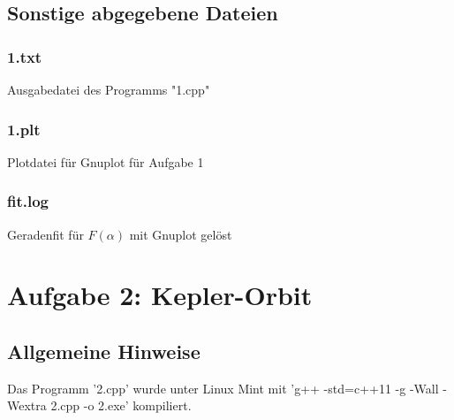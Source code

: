 \documentclass{scrreprt}
\begin{document}
\section*{Sonstige abgegebene Dateien}
\subsection*{1.txt}
Ausgabedatei des Programms "1.cpp"
\subsection*{1.plt}
Plotdatei für Gnuplot für Aufgabe 1
\subsection*{fit.log}
Geradenfit für $F(\alpha)$ mit Gnuplot gelöst

\chapter*{Aufgabe 2: Kepler-Orbit}
\section*{Allgemeine Hinweise}
Das Programm '2.cpp' wurde unter Linux Mint mit 'g++ -std=c++11 -g -Wall -Wextra 2.cpp -o  2.exe' kompiliert.
\end{document}
